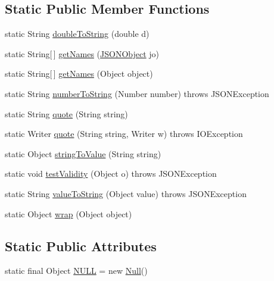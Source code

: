 \subsection*{Static Public Member Functions}
\begin{DoxyCompactItemize}
\item 
static String \hyperlink{classorg_1_1json_1_1_j_s_o_n_object_aad3ea50c3546331486737bcb24e42460}{double\-To\-String} (double d)
\item 
static String\mbox{[}$\,$\mbox{]} \hyperlink{classorg_1_1json_1_1_j_s_o_n_object_a30d4e44e4c8e03341c346970a00ba283}{get\-Names} (\hyperlink{classorg_1_1json_1_1_j_s_o_n_object}{J\-S\-O\-N\-Object} jo)
\item 
static String\mbox{[}$\,$\mbox{]} \hyperlink{classorg_1_1json_1_1_j_s_o_n_object_acf2ec104b4cbbf2947b155d54047efe8}{get\-Names} (Object object)
\item 
static String \hyperlink{classorg_1_1json_1_1_j_s_o_n_object_a5ea1eb29e2e3bdc7b4fae0579ead8525}{number\-To\-String} (Number number)  throws J\-S\-O\-N\-Exception 
\item 
static String \hyperlink{classorg_1_1json_1_1_j_s_o_n_object_abe60222a3919d3f88f104486c1ef13fe}{quote} (String string)
\item 
static Writer \hyperlink{classorg_1_1json_1_1_j_s_o_n_object_aac3d22e558d472049d4c8702cdaf676a}{quote} (String string, Writer w)  throws I\-O\-Exception 
\item 
static Object \hyperlink{classorg_1_1json_1_1_j_s_o_n_object_a23f861897abe58eb41c044dd63667319}{string\-To\-Value} (String string)
\item 
static void \hyperlink{classorg_1_1json_1_1_j_s_o_n_object_a406920be130176bad74d605bae04a6da}{test\-Validity} (Object o)  throws J\-S\-O\-N\-Exception 
\item 
static String \hyperlink{classorg_1_1json_1_1_j_s_o_n_object_ab386b6f594205eecdbe023ad7cb26105}{value\-To\-String} (Object value)  throws J\-S\-O\-N\-Exception 
\item 
static Object \hyperlink{classorg_1_1json_1_1_j_s_o_n_object_a5aa793d5ebe4bb6002bd37d84d65742e}{wrap} (Object object)
\end{DoxyCompactItemize}
\subsection*{Static Public Attributes}
\begin{DoxyCompactItemize}
\item 
static final Object \hyperlink{classorg_1_1json_1_1_j_s_o_n_object_a01c74a31a1abfd34ab13beb9347855ac}{N\-U\-L\-L} = new \hyperlink{classorg_1_1json_1_1_j_s_o_n_object_1_1_null}{Null}()
\end{DoxyCompactItemize}
